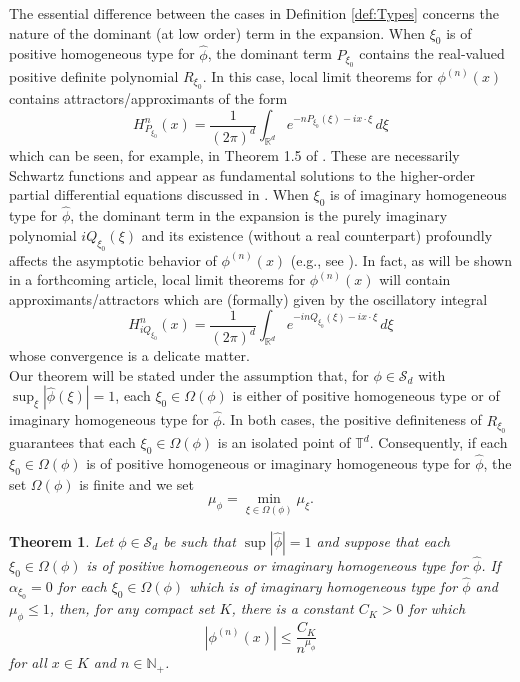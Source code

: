 \documentclass[11pt]{article}
\newtheorem{theorem}{Theorem}[section]
\theoremstyle{remark}
\begin{document}
\noindent The essential difference between the cases in Definition \ref{def:Types} 
concerns the nature of the dominant (at low order) term in the expansion. When $\xi_0$ is of positive homogeneous type for $\widehat{\phi}$, the dominant term $P_{\xi_0}$ contains the real-valued positive definite polynomial $R_{\xi_0}$. In this case, local limit theorems for $\phi^{(n)}(x)$ contains attractors/approximants of the form
\begin{equation*}
    H^n_{P_{\xi_0}}(x)=\frac{1}{(2\pi)^d}\int_{\mathbb{R}^d}e^{-nP_{\xi_0}(\xi)-ix\cdot\xi}\,d\xi
\end{equation*}
which can be seen, for example, in Theorem 1.5 of \cite{randles_convolution_2017}. These are necessarily Schwartz functions and appear as fundamental solutions to the higher-order partial differential equations discussed in \cite{randles_positive-homogeneous_2017}. When $\xi_0$ is of imaginary homogeneous type for $\widehat{\phi}$, the dominant term in the expansion is the purely imaginary polynomial $iQ_{\xi_0}(\xi)$ and its existence (without a real counterpart) profoundly affects the asymptotic behavior of $\phi^{(n)}(x)$ (e.g., see \cite{randles_convolution_2015}). In fact, as will be shown in a forthcoming article, local limit theorems for $\phi^{(n)}(x)$ will contain approximants/attractors which are (formally) given by the oscillatory integral
\begin{equation*}
    H_{iQ_{\xi_0}}^{n}(x)=\frac{1}{(2\pi)^d}\int_{\mathbb{R}^d}e^{-inQ_{\xi_0}(\xi)-ix\cdot \xi}\,d\xi
\end{equation*}
whose convergence is a delicate matter.\\






\noindent Our theorem will be stated under the assumption that, for $\phi\in\mathcal{S}_d$ with $\sup_\xi|\widehat{\phi}(\xi)|=1$, each $\xi_0\in\Omega(\phi)$ is either of positive homogeneous type or of imaginary homogeneous type for $\widehat{\phi}$. In both cases, the positive definiteness of $R_{\xi_0}$ guarantees that each $\xi_0\in\Omega(\phi)$ is an isolated point of $\mathbb{T}^d$. Consequently, if each $\xi_0\in\Omega(\phi)$ is of positive homogeneous or imaginary homogeneous type for $\widehat{\phi}$, the set $\Omega(\phi)$ is finite and we set
\begin{equation*}
    \mu_{\phi}=\min_{\xi\in\Omega(\phi)}\mu_{\xi}.
\end{equation*}

\begin{theorem}\label{thm:ConvolutionPowerEstimate}
Let $\phi\in\mathcal{S}_d$ be such that $\sup |\widehat{\phi}|=1$ and suppose that each $\xi_0\in\Omega(\phi)$ is of positive homogeneous or imaginary homogeneous type for $\widehat{\phi}$. If $\alpha_{\xi_0}=0$ for each $\xi_0\in\Omega(\phi)$ which is of imaginary homogeneous type for $\widehat{\phi}$ and $\mu_{\phi}\leq 1$, then, for any compact set $K$, there is a constant $C_K>0$ for which
\begin{equation*}
    \left|\phi^{(n)}(x)\right|\leq\frac{C_K}{n^{\mu_\phi}}
\end{equation*}
for all $x\in K$ and $n\in\mathbb{N}_+$.
\end{theorem}
\end{document}

